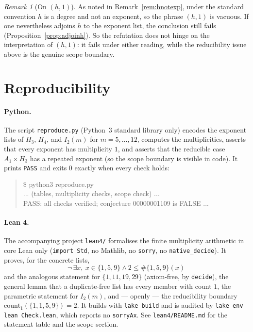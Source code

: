 \documentclass[11pt]{article}
\theoremstyle{definition}
\theoremstyle{remark}
\newtheorem{remark}[theorem]{Remark}
\begin{document}
\begin{remark}[On $(h,1)$]
As noted in Remark~\ref{rem:hnotexp}, under the standard convention $h$ is a
degree and not an exponent, so the phrase $(h,1)$ is vacuous. If one
nevertheless adjoins $h$ to the exponent list, the conclusion still fails
(Proposition~\ref{prop:adjoinh}). So the refutation does not hinge on the
interpretation of $(h,1)$: it fails under either reading, while the
reducibility issue above is the genuine scope boundary.
\end{remark}

\section{Reproducibility}

\paragraph{Python.} The script \texttt{reproduce.py} (Python~3 standard library
only) encodes the exponent lists of $H_3$, $H_4$, and $I_2(m)$ for
$m = 5, \dots, 12$, computes the multiplicities, asserts that every exponent has
multiplicity $1$, and asserts that the reducible case $A_1 \times H_3$ has a
repeated exponent (so the scope boundary is visible in code). It prints
\texttt{PASS} and exits $0$ exactly when every check holds:
\begin{quote}\ttfamily
\$ python3 reproduce.py\\
... (tables, multiplicity checks, scope check) ...\\
PASS: all checks verified; conjecture 00000001109 is FALSE ...
\end{quote}

\paragraph{Lean 4.} The accompanying project \texttt{lean4/} formalises the
finite multiplicity arithmetic in core Lean only (\texttt{import Std}, no
Mathlib, no \texttt{sorry}, no \texttt{native\_decide}). It proves, for the
concrete lists,
\[
\neg\,\exists x,\ x \in \{1,5,9\} \wedge 2 \le \#\{1,5,9\}(x)
\]
and the analogous statement for $\{1,11,19,29\}$ (axiom-free, by
\texttt{decide}), the general lemma that a duplicate-free list has every member
with count $1$, the parametric statement for $I_2(m)$, and --- openly --- the
reducibility boundary $\mathrm{count}_{1}(\{1,1,5,9\}) = 2$. It builds with
\texttt{lake build} and is audited by \texttt{lake env lean Check.lean}, which
reports no \texttt{sorryAx}. See \texttt{lean4/README.md} for the statement
table and the scope section.
\end{document}
